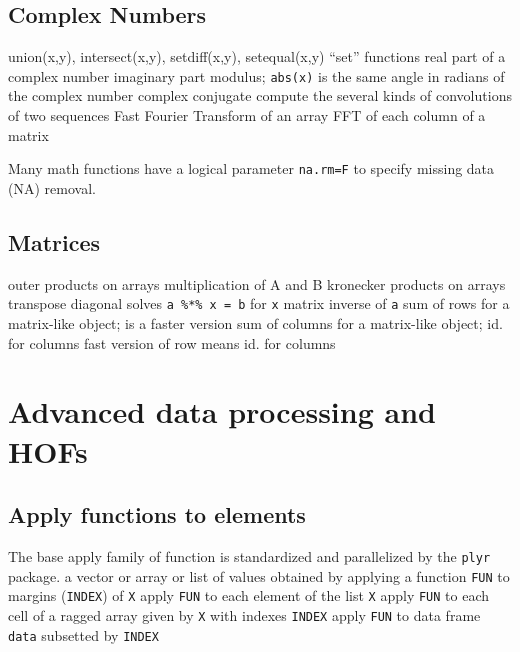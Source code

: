 \subsection{Complex Numbers}{{\smalltt union(x,y),  intersect(x,y),  setdiff(x,y),  setequal(x,y)}}
	{``set'' functions}
	{real part of a complex number}
	{imaginary part}
	{modulus; {\tt abs(x)} is the same}
	{angle in radians of the complex number}
	{complex conjugate}
	{compute the several kinds of convolutions of two sequences}
	{Fast Fourier Transform of an array}
	{FFT of each column of a matrix}

Many math functions have a logical parameter {\tt na.rm=F} to
specify missing data (NA) removal.

\subsection{Matrices}{}
	{outer products on arrays}
	{multiplication of A and B}
	{kronecker products on arrays}
	{transpose}
	{diagonal}
	{solves {\tt a \%*\% x = b} for {\tt x}}
	{matrix inverse of {\tt a}}
	{sum of rows for a matrix-like object;}
	{is a faster version}
	{sum of columns for a matrix-like object;}
	{id. for columns}
	{fast version of row means}
	{id. for columns}

\section{Advanced data processing and HOFs}{}
\subsection{Apply functions to elements}{The base apply family of function is
    standardized and parallelized by the {\tt plyr} package.}
	{a vector or array or list of values obtained by applying a function {\tt FUN} to margins ({\tt INDEX}) of {\tt X}}
	{apply {\tt FUN} to each element of the list {\tt X}}
	{apply {\tt FUN} to each cell of a ragged array given by {\tt X} with indexes {\tt INDEX}}
	{apply {\tt FUN} to data frame {\tt data} subsetted by {\tt INDEX}}
